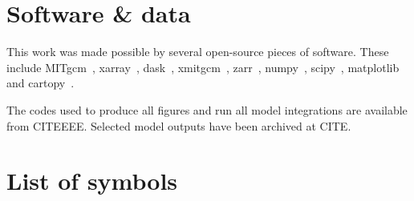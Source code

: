 \chapter*{Software \& data}
This work was made possible by several open-source pieces of software. These include MITgcm~\citep{mitgcm}, xarray~\citep{Hoyer2017}, dask~\citep{DaskDevelopmentTeam2016}, xmitgcm~\citep{Abernathey2021}, zarr~\citep{Miles2022}, numpy~\citep{Harris2020}, scipy~\citep{Virtanen2020}, matplotlib~\citep{Hunter2007} and cartopy~\citep{Elson2022}.

The codes used to produce all figures and run all model integrations are available from CITEEEE. Selected model outputs have been archived at CITE.

\chapter*{List of symbols}

